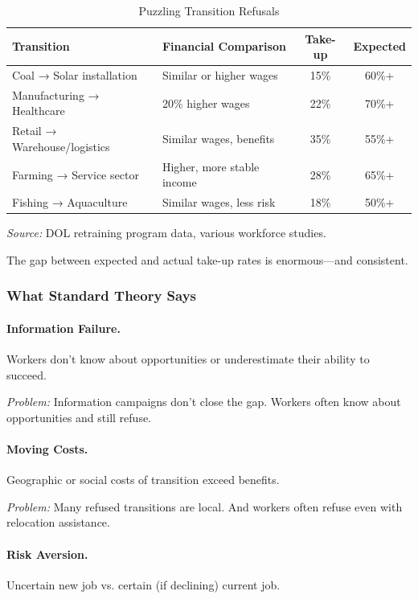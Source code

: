 \begin{table}[htbp]
\centering
\caption{Puzzling Transition Refusals}
\label{tab:refusal-puzzles}
\small
\begin{tabular}{@{}p{4cm}p{4cm}cc@{}}
\toprule
\textbf{Transition} & \textbf{Financial Comparison} & \textbf{Take-up} & \textbf{Expected} \\
\midrule
Coal → Solar installation & Similar or higher wages & 15\% & 60\%+ \\
Manufacturing → Healthcare & 20\% higher wages & 22\% & 70\%+ \\
Retail → Warehouse/logistics & Similar wages, benefits & 35\% & 55\%+ \\
Farming → Service sector & Higher, more stable income & 28\% & 65\%+ \\
Fishing → Aquaculture & Similar wages, less risk & 18\% & 50\%+ \\
\bottomrule
\end{tabular}
\begin{flushleft}
\small\textit{Source:} DOL retraining program data, various workforce studies.
\end{flushleft}
\end{table}

The gap between expected and actual take-up rates is enormous---and consistent.

\subsubsection{What Standard Theory Says}

\paragraph{Information Failure.}
Workers don't know about opportunities or underestimate their ability to succeed.

\textit{Problem:} Information campaigns don't close the gap. Workers often 
know about opportunities and still refuse.

\paragraph{Moving Costs.}
Geographic or social costs of transition exceed benefits.

\textit{Problem:} Many refused transitions are local. And workers often 
refuse even with relocation assistance.

\paragraph{Risk Aversion.}
Uncertain new job vs. certain (if declining) current job.

